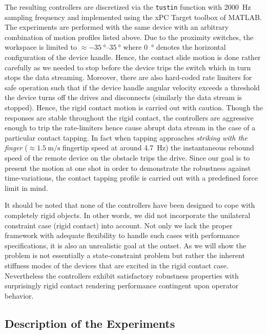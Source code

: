 The resulting controllers are discretized via the \texttt{tustin} function with \SI{2000}{\hertz} sampling frequency and implemented using 
the xPC Target toolbox of MATLAB. The experiments are performed with the same device with an arbitrary combination of motion profiles 
listed above. Due to the proximity switches, the workspace is limited to $\approx \SIrange{-35}{35}{\degree}$ where \SI{0}{\degree} denotes 
the horizontal configuration of the device handle. Hence, the contact slide motion is done rather carefully as we needed to stop before the 
device trips the switch which in turn stops the data streaming. Moreover, there are also hard-coded rate limiters for safe operation such 
that if the device handle angular velocity exceeds a threshold the device turns off the drives and disconnects (similarly the data stream 
is stopped). Hence, the rigid contact motion is carried out with caution. Though the responses are stable throughout the rigid contact, the 
controllers are aggressive enough to trip the rate-limiters hence cause abrupt data stream in the case of a particular contact tapping. In 
fact when tapping approaches \emph{striking with the finger} ($\approx \SI{1.5}{\meter\per\second}$ fingertip speed at around 
\SI{4.7}{\hertz}) the instantaneous rebound speed of the remote device on the obstacle trips the drive. Since our goal is to present the 
motion at one shot in order to demonstrate the robustness against time-variations, the contact tapping profile is carried out with a 
predefined force limit in mind. 


It should be noted that none of the controllers have been designed to cope with completely rigid objects. In other words, we did not 
incorporate the unilateral constraint case (rigid contact) into account. Not only we lack the proper framework with adequate flexibility 
to handle such cases with performance specifications, it is also an unrealistic goal at the outset. As we will show the problem is not 
essentially a state-constraint problem but rather the inherent stiffness modes of the devices that are excited in the rigid contact case. 
Nevertheless the controllers exhibit satisfactory robustness properties with surprisingly rigid contact rendering performance contingent 
upon operator behavior.  

\subsection{Description of the Experiments}

